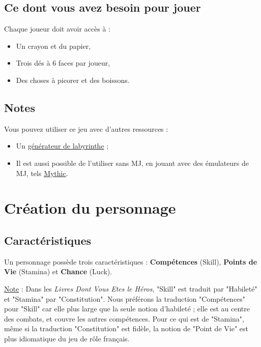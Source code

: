 \documentclass[a4paper, 11pt, twoside]{article}
\begin{document}
\subsection{Ce dont vous avez besoin pour jouer}
\label{sec:org795952a}

Chaque joueur doit avoir accès à :
\begin{itemize}
\item Un crayon et du papier,
\item Trois dés à 6 faces par joueur,
\item Des choses à picorer et des boissons.
\end{itemize}

\subsection{Notes}
\label{sec:orgf2eb6b9}

Vous pouvez utiliser ce jeu avec d'autres ressources :
\begin{itemize}
\item Un \href{https://github.com/orey/jdr/tree/master/G\%25C3\%25A9n\%25C3\%25A9rateurLabyrinthe}{générateur de labyrinthe} ;
\item Il est aussi possible de l'utiliser sans MJ, en jouant avec des émulateurs de MJ, tels \href{https://github.com/orey/jdr/tree/master/Mythic-fr}{Mythic}.
\end{itemize}

\section{Création du personnage}
\label{sec:org56ba3f2}

\subsection{Caractéristiques}
\label{sec:org313842b}

Un personnage possède trois caractéristiques : \textbf{Compétences} (Skill), \textbf{Points de Vie} (Stamina)  et \textbf{Chance} (Luck).

\uline{Note} : Dans les \emph{Livres Dont Vous Etes le Héros}, "Skill" est traduit par "Habileté" et "Stamina" par "Constitution". Nous préférons la traduction "Compétences" pour "Skill" car elle plus large que la seule notion d'habileté ; elle est au centre des combats, et couvre les autres compétences. Pour ce qui est de "Stamina", même si la traduction "Constitution" est fidèle, la notion de "Point de Vie" est plus idiomatique du jeu de rôle français.
\end{document}
